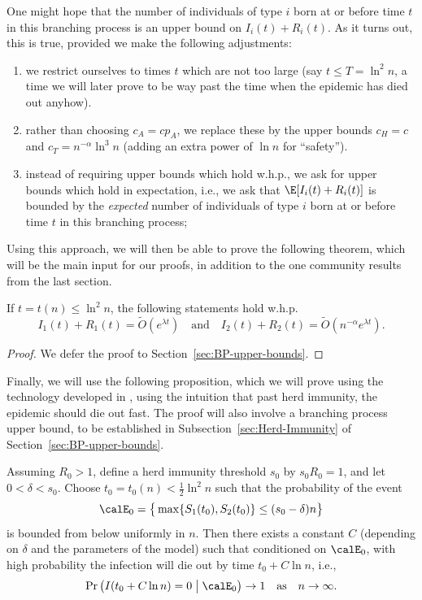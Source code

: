 \documentclass[11pt]{article}
\begin{document}
One might hope that the number of individuals of type $i$ born at or before time $t$ in this branching process is an upper bound on $I_i(t)+R_i(t)$.  As it turns out, this is true, provided we make the following adjustments:  
\begin{enumerate}[label=(\alph*)]
     \item we restrict ourselves to times $t$ which are not too large (say $t\leq T=\ln^2n$, a time we will later prove to be way past the time when the epidemic has died out anyhow).  
     \item  rather than choosing $c_A=c p_A$, we replace these by the upper bounds $c_H=c$ and $c_T=n^{-\alpha}\ln^3 n$ (adding an extra power of $\ln n$ for ``safety'').
    \item instead of requiring upper bounds which hold w.h.p., we ask for upper bounds which hold in expectation, i.e., we ask that $\E[I_i(t)+R_i(t)]$ is bounded by the {\it expected} number of individuals of type $i$ born at or before time $t$ in this branching process; 
 \end{enumerate}
Using this approach, we will then be able to prove the following theorem, which will be the main input for our proofs, in addition to the one community results from the last section.


\begin{proposition}\label{prop:BP-upper-bound}
If $t=t(n)\leq\ln^2n$, the following statements hold w.h.p.
    $$
    I_1(t)+R_1(t)= \tilde O\left(e^{\lambda t}\right)
  \quad\text{and}\quad
    I_2(t)+R_2(t)=\tilde O\left(n^{-\alpha}e^{\lambda t}\right).
    $$
\end{proposition}

\begin{proof}
    We defer the proof to Section~\ref{sec:BP-upper-bounds}.
\end{proof}
Finally, we will use the following proposition, which we will prove using the technology developed in \cite{borgs2024lawlargenumberssir}, using the intuition that past herd immunity, the epidemic should die out fast.  The proof will also involve a branching process upper bound, to be established in Subsection~\ref{sec:Herd-Immunity} of Section~\ref{sec:BP-upper-bounds}.



\begin{proposition}\label{prop:herd-immunity} Assuming $R_0>1$, define a herd immunity threshold $s_0$ by $s_0R_0=1$, and let $0<\delta<s_0$.
Choose $t_0=t_0(n)<\frac 12\ln^2 n$  such that the probability of the event
$$
\calE_0=\big\{\max\{S_1(t_0),S_2(t_0)\}\leq (s_0-\delta)n\big\}
$$
is bounded from below uniformly in $n$.
Then there exists a constant $C$ (depending on $\delta$ and the parameters of the model) such that conditioned on  $\calE_0$, with high probability
the infection will die out by time $t_0+C\ln n$, i.e., 
$$
\Pr\big(I(t_0+C\ln n)=0\;\big|\;\calE_0\big)\to 1 \quad\text{as}\quad n\to\infty.
$$
\end{proposition}
\end{document}
